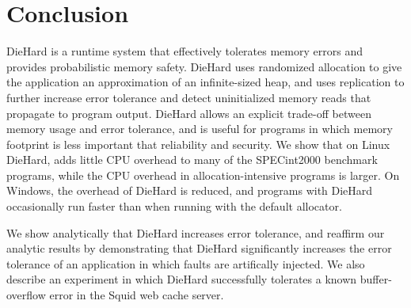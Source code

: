 \documentclass{sig-alternate}
\newcommand{\punt}[1]{}
\begin{document}
\punt{
Randomization has also been fruitfully employed for software
testing~\cite{567468,csallner04jcrasher,liblit03bug,1065014,miller90empirical}. Statistical
debugging is a distributed assertion sampling technique that helps
pinpoint the location of bugs~\cite{liblit03bug,1065014}. Mutation
testing injects faults into a program by applying random mutations,
and verifies that the test suite contains a test that differentiates
the mutant from the original~\cite{567468}. Random input generation
testers like Fuzz~\cite{miller90empirical} and
JCrasher~\cite{csallner04jcrasher} can also uncover errors. However,
because even loop-free programs have an exponential number of paths,
exploring a significant fraction of all paths prior to deployment is
infeasible. Testing can help reduce the number of memory errors
exhibited by a program, but cannot prevent them once the program is
deployed.
}


\section{Conclusion}
\label{sec:conclusion}

\label{sec:futurework}

DieHard is a runtime system that effectively tolerates memory errors
and provides probabilistic memory safety.  DieHard uses randomized
allocation to give the application an approximation of an
infinite-sized heap, and uses replication to further increase error
tolerance and detect uninitialized memory reads that propagate to
program output.  DieHard allows an explicit trade-off between memory
usage and error tolerance, and is useful for programs in which memory
footprint is less important that reliability and security.  We show
that on Linux DieHard, adds little CPU overhead to many of the
SPECint2000 benchmark programs, while the CPU overhead in
allocation-intensive programs is larger.  On Windows, the overhead of
DieHard is reduced, and programs with DieHard occasionally run faster
than when running with the default allocator.

We show analytically that DieHard increases error tolerance, and
reaffirm our analytic results by demonstrating that DieHard
significantly increases the error tolerance of an application in which
faults are artifically injected.  We also describe an experiment in
which DieHard successfully tolerates a known buffer-overflow error in the
Squid web cache server.
\end{document}

